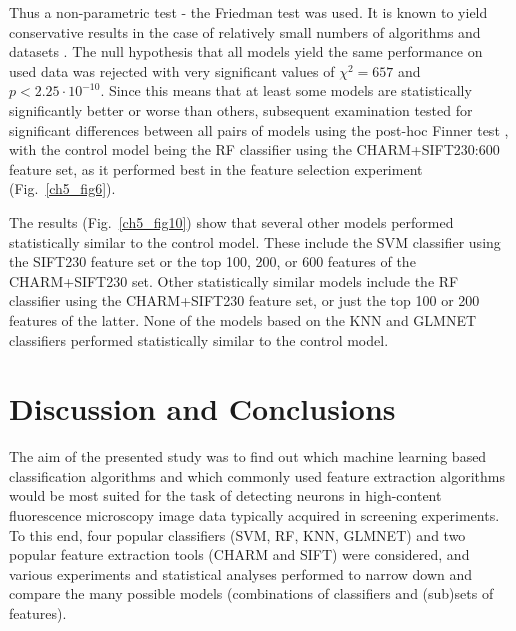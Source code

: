 Thus a non-parametric test - the Friedman test \cite{friedman1940comparison} was used. It is known to yield conservative results in the case of relatively small numbers of algorithms and datasets \cite{garcia2010advanced}. The null hypothesis that all models yield the same performance on used data was rejected with very significant values of $\chi^2 = 657$ and $p < 2.25 \cdot 10^{-10}$. Since this means that at least some models are statistically significantly better or worse than others, subsequent examination tested for significant differences between all pairs of models using the post-hoc Finner test \cite{finner1993monotonicity}, with the control model being the RF classifier using the CHARM+SIFT230:600 feature set, as it performed best in the feature selection experiment (Fig.~\ref{ch5_fig6}).

The results (Fig.~\ref{ch5_fig10}) show that several other models performed statistically similar to the control model. These include the SVM classifier using the SIFT230 feature set or the top 100, 200, or 600 features of the CHARM+SIFT230 set. Other statistically similar models include the RF classifier using the CHARM+SIFT230 feature set, or just the top 100 or 200 features of the latter. None of the models based on the KNN and GLMNET classifiers performed statistically similar to the control model.

\section{Discussion and Conclusions}
\label{sec:discussion}
The aim of the presented study was to find out which machine learning based classification algorithms and which commonly used feature extraction algorithms would be most suited for the task of detecting neurons in high-content fluorescence microscopy image data typically acquired in screening experiments. To this end, four popular classifiers (SVM, RF, KNN, GLMNET) and two popular feature extraction tools (CHARM and SIFT) were considered, and various experiments and statistical analyses performed to narrow down and compare the many possible models (combinations of classifiers and (sub)sets of features).

